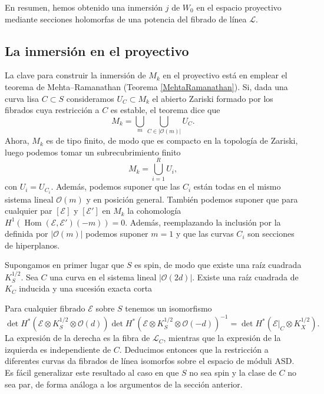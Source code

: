\documentclass[12pt, a4paper]{amsart}
\newcommand\EE{\mathscr{E}}
\newcommand\LL{\mathscr{L}}
\newcommand\OO{\mathscr{O}}
\DeclareMathOperator\Hom{Hom}
\theoremstyle{remark} \newtheorem{rmk}[thm]{Observación}
\theoremstyle{remark} \newtheorem{rmks}[thm]{Observaciones}
\theoremstyle{definition} \newtheorem{defn}[thm]{Definición}
\theoremstyle{definition} \newtheorem{ejs}[thm]{Ejemplos}
\theoremstyle{definition} \newtheorem{ej}[thm]{Ejemplo}
\begin{document}
En resumen, hemos obtenido una inmersión $j$ de $W_0$ en el espacio proyectivo mediante secciones holomorfas de una potencia del fibrado de línea $\LL$.



\subsection{La inmersión en el proyectivo}
La clave para construir la inmersión de $M_k$ en el proyectivo está en emplear el teorema de Mehta--Ramanathan (Teorema \ref{MehtaRamanathan}). Si, dada una curva lisa $C\subset S$ consideramos $U_C\subset M_k$ el abierto Zariski formado por los fibrados cuya restricción a $C$ es estable, el teorema dice que 
\begin{equation*}
	M_k= \bigcup_{m} \bigcup_{C \in |\OO(m)|} U_C.
\end{equation*} 
Ahora, $M_k$ es de tipo finito, de modo que es compacto en la topología de Zariski, luego podemos tomar un subrecubrimiento finito
\begin{equation*}
M_k=\bigcup_{i=1}^R U_i,
\end{equation*} 
con $U_i=U_{C_i}$. Además, podemos suponer que las $C_i$ están todas en el mismo sistema lineal $\OO(m)$ y en posición general. También podemos suponer que para cualquier par $[\EE]$ y $[\EE']$ en  $M_k$ la cohomología $H^1(\Hom(\EE,\EE')(-m))=0$. Además, reemplazando la inclusión por la definida por $|\OO(m)|$ podemos suponer $m=1$ y que las curvas $C_i$ son secciones de hiperplanos.

Supongamos en primer lugar que $S$ es spin, de modo que existe una raíz cuadrada $K_S^{1/2}$. Sea $C$ una curva en el sistema lineal $|\OO(2d)|$. Existe una raíz cuadrada de $K_C$ inducida y una sucesión exacta corta
\begin{center}
\end{center}
Para cualquier fibrado $\EE$ sobre $S$ tenemos un isomorfismo
\begin{equation*}
	\det H^*(\EE \otimes K_S^{1/2} \otimes \OO(d)) 	\det H^*(\EE \otimes K_S^{1/2} \otimes \OO(-d))^{-1} = \det H^*(\EE|_C\otimes K_X^{1/2}).
\end{equation*} 
La expresión de la derecha es la fibra de $\LL_C$, mientras que la expresión de la izquierda es independiente de $C$. Deducimos entonces que la restricción a diferentes curvas da fibrados de línea isomorfos sobre el espacio de móduli ASD. Es fácil generalizar este resultado al caso en que $S$ no sea spin y la clase de $C$ no sea par, de forma análoga a los argumentos de la sección anterior.
\end{document}
